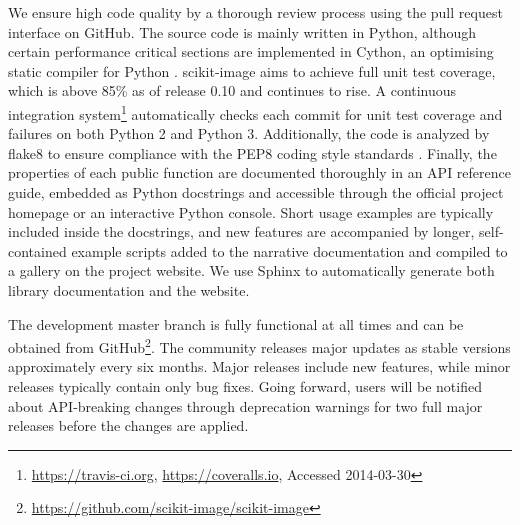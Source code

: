   We ensure high code quality by a thorough review process using the pull request interface on GitHub. The source code is mainly written in Python, although certain performance critical sections are implemented in Cython, an optimising static compiler for Python \citep{Cython}. scikit-image aims to achieve full unit test coverage, which is above 85\% as of release 0.10 and continues to rise. A continuous integration system\footnote{\url{https://travis-ci.org}, \url{https://coveralls.io}, Accessed 2014-03-30} automatically checks each commit for unit test coverage and failures on both Python 2 and Python 3. Additionally, the code is analyzed by flake8 \citep{flake8} to ensure compliance with the PEP8 coding style standards \citep{PEP8}. Finally, the properties of each public function are documented thoroughly in an API reference guide, embedded as Python docstrings and accessible through the official project homepage or an interactive Python console. Short usage examples are typically included inside the docstrings, and new features are accompanied by longer, self-contained example scripts added to the narrative documentation and compiled to a gallery on the project website. We use Sphinx \citep{Sphinx} to automatically generate both library documentation and the website.

  The development master branch is fully functional at all times and can be obtained from GitHub\footnote{\url{https://github.com/scikit-image/scikit-image}}. The community releases major updates as stable versions approximately every six months. Major releases include new features, while minor releases typically contain only bug fixes. Going forward, users will be notified about API-breaking changes through deprecation warnings for two full major releases before the changes are applied.
